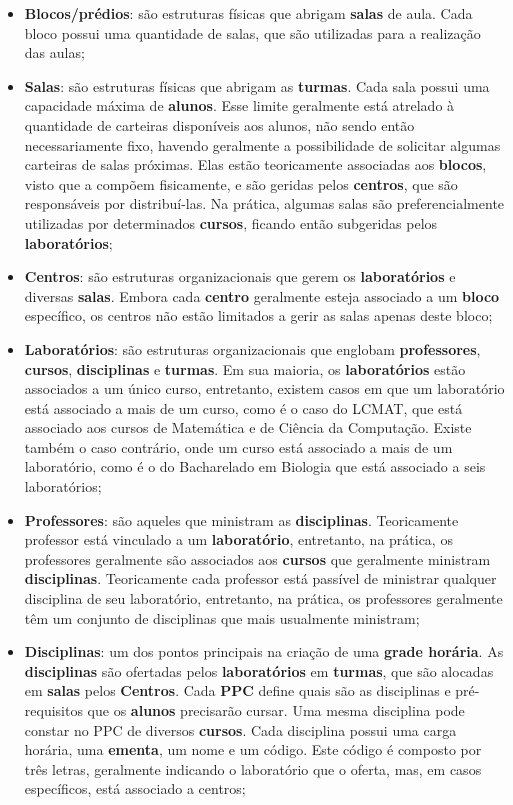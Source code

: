 \begin{itemize}
  \item \textbf{Blocos/prédios}: são estruturas físicas que abrigam \textbf{salas} de aula. Cada bloco possui uma quantidade de salas, que são utilizadas para a realização das aulas;
  \item \textbf{Salas}: são estruturas físicas que abrigam as \textbf{turmas}. Cada sala possui uma capacidade máxima de \textbf{alunos}. Esse limite geralmente está atrelado à quantidade de carteiras disponíveis aos alunos, não sendo então necessariamente fixo, havendo geralmente a possibilidade de solicitar algumas carteiras de salas próximas. Elas estão teoricamente associadas aos \textbf{blocos}, visto que a compõem fisicamente, e são geridas pelos \textbf{centros}, que são responsáveis por distribuí-las. Na prática, algumas salas são preferencialmente utilizadas por determinados \textbf{cursos}, ficando então subgeridas pelos \textbf{laboratórios};
  \item \textbf{Centros}: são estruturas organizacionais que gerem os \textbf{laboratórios} e diversas \textbf{salas}. Embora cada \textbf{centro} geralmente esteja associado a um \textbf{bloco} específico, os centros não estão limitados a gerir as salas apenas deste bloco;
  \item \textbf{Laboratórios}: são estruturas organizacionais que englobam \textbf{professores}, \textbf{cursos}, \textbf{disciplinas} e \textbf{turmas}. Em sua maioria, os \textbf{laboratórios} estão associados a um único curso, entretanto, existem casos em que um laboratório está associado a mais de um curso, como é o caso do LCMAT, que está associado aos cursos de Matemática e de Ciência da Computação. Existe também o caso contrário, onde um curso está associado a mais de um laboratório, como é o do Bacharelado em Biologia que está associado a seis laboratórios;
  \item \textbf{Professores}: são aqueles que ministram as \textbf{disciplinas}. Teoricamente professor está vinculado a um \textbf{laboratório}, entretanto, na prática, os professores geralmente são associados aos \textbf{cursos} que geralmente ministram \textbf{disciplinas}. Teoricamente cada professor está passível de ministrar qualquer disciplina de seu laboratório, entretanto, na prática, os professores geralmente têm um conjunto de disciplinas que mais usualmente ministram;
  \item \textbf{Disciplinas}: um dos pontos principais na criação de uma \textbf{grade horária}. As \textbf{disciplinas} são ofertadas pelos \textbf{laboratórios} em \textbf{turmas}, que são alocadas em \textbf{salas} pelos \textbf{Centros}. Cada \textbf{PPC} define quais são as disciplinas e pré-requisitos que os \textbf{alunos} precisarão cursar. Uma mesma disciplina pode constar no PPC de diversos \textbf{cursos}. Cada disciplina possui uma carga horária, uma \textbf{ementa}, um nome e um código. Este código é composto por três letras, geralmente indicando o laboratório que o oferta, mas, em casos específicos, está associado a centros;

\end{itemize}
